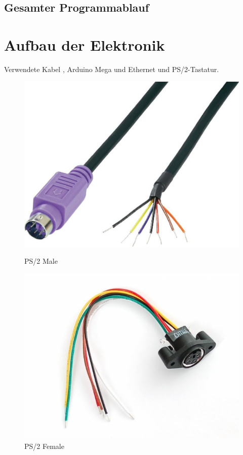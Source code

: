 \subsection{Gesamter Programmablauf}



\section{Aufbau der Elektronik}
Verwendete Kabel \cite{ps2male} \cite{ps2female}, Arduino Mega und Ethernet \cite{arduino} und PS/2-Tastatur.
\begin{figure}
  \centering
  \begin{minipage}{0.45\textwidth}
    \centering
    \includegraphics[width=1\textwidth]{images/ps2_male.jpg}
    \caption{PS/2 Male}
    \label{ps2_male}
  \end{minipage}
  \begin{minipage}{0.45\textwidth}
    \centering
    \includegraphics[width=1\textwidth]{images/ps2_female.jpg}
    \caption{PS/2 Female}
    \label{ps2_female}
  \end{minipage}
\end{figure}

